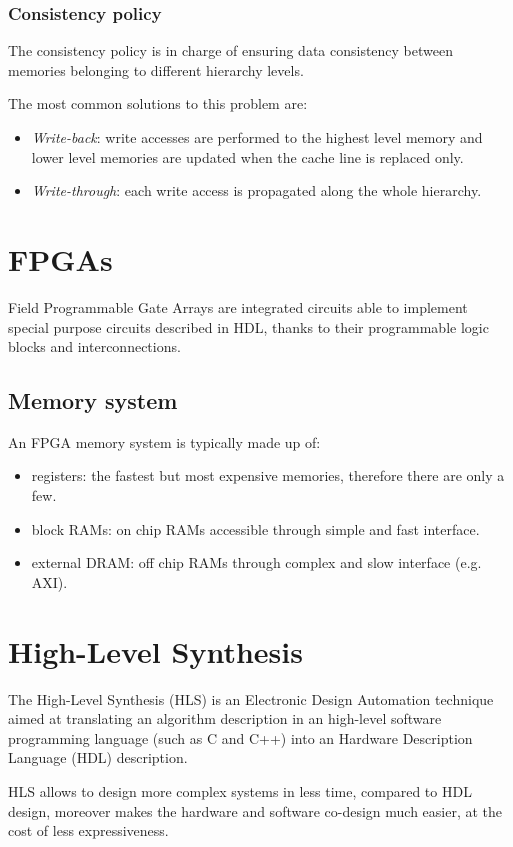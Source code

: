 \documentclass[11pt,a4paper]{memoir}
\begin{document}
\subsubsection{Consistency policy}
The consistency policy is in charge of ensuring data consistency between memories
belonging to different hierarchy levels.

The most common solutions to this problem are:
\begin{itemize}
	\item \emph{Write-back}: write accesses are performed to the highest
		level memory and lower level memories are updated when the cache
		line is replaced only.
	\item \emph{Write-through}: each write access is propagated along the
		whole hierarchy.
\end{itemize}

\section{FPGAs}
Field Programmable Gate Arrays are integrated circuits able to implement special
purpose circuits described in HDL, thanks to their programmable logic blocks and
interconnections.
\subsection{Memory system}
An FPGA memory system is typically made up of:
\begin{itemize}
	\item registers: the fastest but most expensive memories, therefore
		there are only a few.
	\item block RAMs: on chip RAMs accessible through simple and fast
		interface.
	\item external DRAM: off chip RAMs through complex and slow interface
		(e.g. AXI).
\end{itemize}

\section{High-Level Synthesis}
The High-Level Synthesis (HLS) is an Electronic Design Automation technique
aimed at translating an algorithm description in an high-level software
programming language (such as C and C++) into an Hardware Description Language
(HDL) description.

HLS allows to design more complex systems in less time, compared to HDL design,
moreover makes the hardware and software co-design much easier, at the cost of
less expressiveness.
\end{document}
